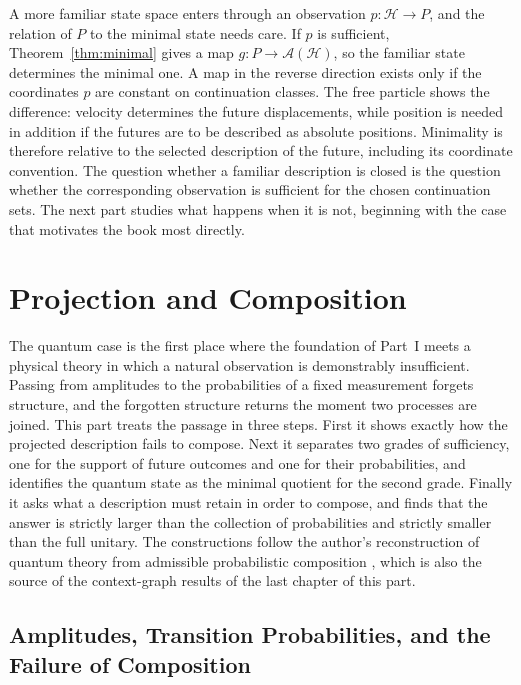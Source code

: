 \documentclass[11pt,oneside]{book}
\theoremstyle{definition}
\theoremstyle{remark}
\newcommand{\Hist}{\mathcal{H}}
\newcommand{\Adm}{\mathcal{A}}
\begin{document}
A more familiar state space enters through an observation $p\colon\Hist\to P$, and the relation of $P$ to the minimal state needs care. If $p$ is sufficient, Theorem~\ref{thm:minimal} gives a map $g\colon P\to\Adm(\Hist)$, so the familiar state determines the minimal one. A map in the reverse direction exists only if the coordinates $p$ are constant on continuation classes. The free particle shows the difference: velocity determines the future displacements, while position is needed in addition if the futures are to be described as absolute positions. Minimality is therefore relative to the selected description of the future, including its coordinate convention. The question whether a familiar description is closed is the question whether the corresponding observation is sufficient for the chosen continuation sets. The next part studies what happens when it is not, beginning with the case that motivates the book most directly.

\part{Projection and Composition}

The quantum case is the first place where the foundation of Part~I meets a physical theory in which a natural observation is demonstrably insufficient. Passing from amplitudes to the probabilities of a fixed measurement forgets structure, and the forgotten structure returns the moment two processes are joined. This part treats the passage in three steps. First it shows exactly how the projected description fails to compose. Next it separates two grades of sufficiency, one for the support of future outcomes and one for their probabilities, and identifies the quantum state as the minimal quotient for the second grade. Finally it asks what a description must retain in order to compose, and finds that the answer is strictly larger than the collection of probabilities and strictly smaller than the full unitary. The constructions follow the author's reconstruction of quantum theory from admissible probabilistic composition \cite{flyxion2026uqm}, which is also the source of the context-graph results of the last chapter of this part.

\chapter[Amplitudes, Probabilities, and the Failure of Composition]{Amplitudes, Transition Probabilities, and the Failure of Composition}\label{ch:failure}
\end{document}
